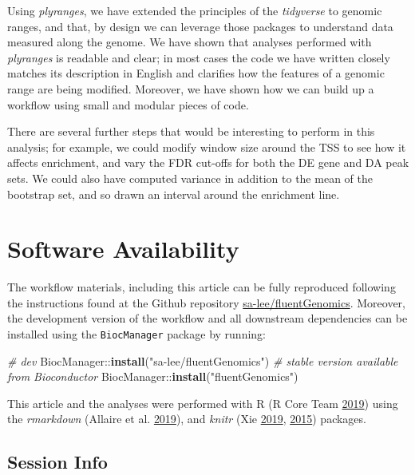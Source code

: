\documentclass[
]{article}
\newenvironment{Shaded}{}{}
\newcommand{\CommentTok}[1]{\textcolor[rgb]{0.38,0.63,0.69}{\textit{#1}}}
\newcommand{\KeywordTok}[1]{\textcolor[rgb]{0.00,0.44,0.13}{\textbf{#1}}}
\newcommand{\NormalTok}[1]{#1}
\newcommand{\OperatorTok}[1]{\textcolor[rgb]{0.40,0.40,0.40}{#1}}
\newcommand{\StringTok}[1]{\textcolor[rgb]{0.25,0.44,0.63}{#1}}
\begin{document}
Using \emph{plyranges}, we have extended the principles of the \emph{tidyverse} to
genomic ranges, and that, by design we can leverage those packages to understand
data measured along the genome. We have shown that analyses performed with
\emph{plyranges} is readable and clear; in most cases the code we have
written closely matches its description in English and clarifies how
the features of a genomic range are being modified. Moreover, we have shown
how we can build up a workflow using small and modular pieces of code.

There are several further steps that would be interesting to perform in this
analysis; for example, we could modify window size around the TSS to see how it
affects enrichment, and vary the FDR cut-offs for
both the DE gene and DA peak sets. We could also have computed variance in addition to
the mean of the bootstrap set, and so drawn an interval around the enrichment
line.

\hypertarget{software-availability}{%
\section{Software Availability}\label{software-availability}}

The workflow materials, including this article can be fully reproduced
following the instructions found at the Github repository
\href{https://github.com/sa-lee/fluentGenomics}{sa-lee/fluentGenomics}. Moreover,
the development version of the workflow and all downstream dependencies can be
installed using the \texttt{BiocManager} package by running:

\begin{Shaded}
\begin{Highlighting}[]
\CommentTok{# dev}
\NormalTok{BiocManager}\OperatorTok{::}\KeywordTok{install}\NormalTok{(}\StringTok{"sa-lee/fluentGenomics"}\NormalTok{)}
\CommentTok{# stable version available from Bioconductor}
\NormalTok{BiocManager}\OperatorTok{::}\KeywordTok{install}\NormalTok{(}\StringTok{"fluentGenomics"}\NormalTok{)}
\end{Highlighting}
\end{Shaded}

This article and the analyses were performed with R (R Core Team \protect\hyperlink{ref-baser}{2019}) using the
\emph{rmarkdown} (Allaire et al. \protect\hyperlink{ref-rmarkdown}{2019}), and \emph{knitr} (Xie \protect\hyperlink{ref-knitr}{2019}, \protect\hyperlink{ref-xie2015}{2015}) packages.

\hypertarget{session-info}{%
\subsection{Session Info}\label{session-info}}
\end{document}
